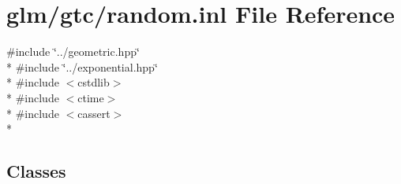 \hypertarget{random_8inl}{\section{glm/gtc/random.inl File Reference}
\label{random_8inl}
}
{\ttfamily \#include \char`\"{}../geometric.\-hpp\char`\"{}}\\*
{\ttfamily \#include \char`\"{}../exponential.\-hpp\char`\"{}}\\*
{\ttfamily \#include $<$cstdlib$>$}\\*
{\ttfamily \#include $<$ctime$>$}\\*
{\ttfamily \#include $<$cassert$>$}\\*
\subsection*{Classes}
